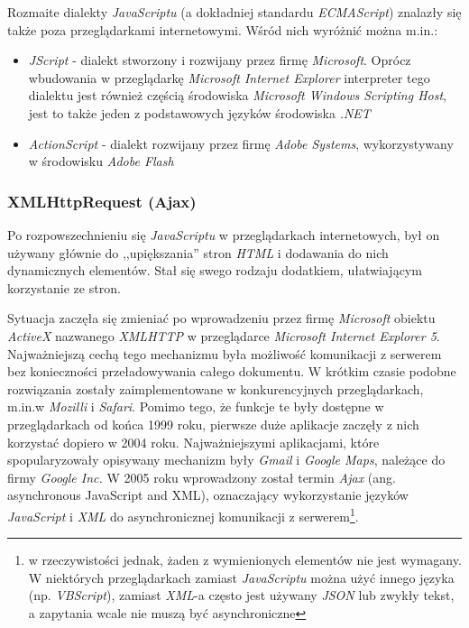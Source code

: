 \documentclass[a4paper,12pt]{article}
\begin{document}
Rozmaite dialekty \emph{JavaScriptu} (a dokładniej standardu
\emph{ECMAScript}) znalazły się także poza przeglądarkami
internetowymi. Wśród nich wyróżnić można m.in.:

\begin{itemize}
\item \emph{JScript} - dialekt stworzony i rozwijany przez firmę
  \emph{Microsoft}. Oprócz wbudowania w przeglądarkę \emph{Microsoft
    Internet Explorer} interpreter tego dialektu jest również częścią
  środowiska \emph{Microsoft Windows Scripting Host}, jest to także
  jeden z podstawowych języków środowiska \emph{.NET}
\item \emph{ActionScript} - dialekt rozwijany przez firmę \emph{Adobe
    Systems}, wykorzystywany w środowisku \emph{Adobe Flash}
\end{itemize}

\subsubsection{XMLHttpRequest (Ajax)}
Po rozpowszechnieniu się \emph{JavaScriptu} w przeglądarkach
internetowych, był on używany głównie do ,,upiększania'' stron
\emph{HTML} i dodawania do nich dynamicznych elementów. Stał się swego
rodzaju dodatkiem, ułatwiającym korzystanie ze stron.

Sytuacja zaczęła się zmieniać po wprowadzeniu przez firmę
\emph{Microsoft} obiektu \emph{ActiveX} nazwanego \emph{XMLHTTP} w
przeglądarce \emph{Microsoft Internet Explorer 5}. Najważniejszą cechą
tego mechanizmu była możliwość komunikacji z serwerem bez konieczności
przeładowywania całego dokumentu. W krótkim czasie podobne rozwiązania
zostały zaimplementowane w konkurencyjnych przeglądarkach, m.in.w
\emph{Mozilli} i \emph{Safari}. Pomimo tego, że funkcje te były
dostępne w przeglądarkach od końca 1999 roku, pierwsze duże aplikacje
zaczęły z nich korzystać dopiero w 2004 roku. Najważniejszymi
aplikacjami, które spopularyzowały opisywany mechanizm były
\emph{Gmail} i \emph{Google Maps}, należące do firmy \emph{Google
  Inc.} W 2005 roku wprowadzony został termin \emph{Ajax}
(ang. asynchronous JavaScript and XML), oznaczający wykorzystanie
języków \emph{JavaScript} i \emph{XML} do asynchronicznej komunikacji
z serwerem\footnote{w rzeczywistości jednak, żaden z wymienionych
  elementów nie jest wymagany. W niektórych przeglądarkach zamiast
  \emph{JavaScriptu} można użyć innego języka (np. \emph{VBScript}),
  zamiast \emph{XML}-a często jest używany \emph{JSON} lub zwykły
  tekst, a zapytania wcale nie muszą być asynchroniczne}.
\end{document}
